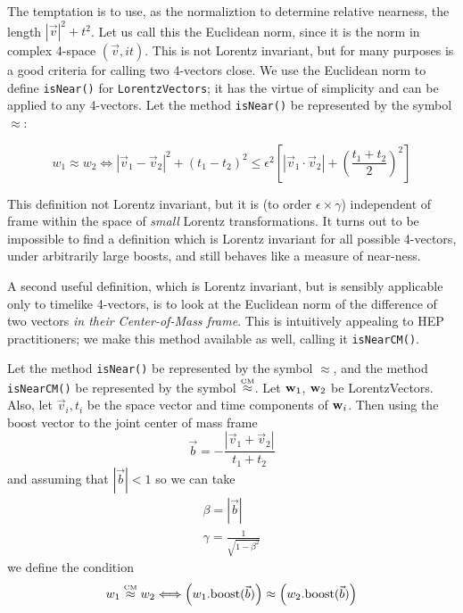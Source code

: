 The temptation is to use, as the normaliztion to determine relative nearness,
the length $|\vec{v}|^2 + t^2$.  Let us call this the Euclidean norm, since it
is the norm in complex 4-space $(\vec{v}, i t)$.
This is not Lorentz invariant, but for
many purposes is a good criteria for calling two 4-vectors close.
We use the Euclidean norm to define {\tt isNear()} for {\tt LorentzVectors};
it has the virtue of simplicity and can be applied to any 4-vectors.
Let the method {\tt isNear()} be represented by the symbol $\approx$:

\begin{equation}
\label{eq:wisNear}
  w_1 \approx w_2 \Longleftrightarrow
  \left|
    \vec{v}_1 - \vec{v}_2
  \right| ^2
  + (t_1 - t_2)^2 \leq
  \epsilon^2
  \left[
    \left|
      \vec{v}_1 \cdot \vec{v}_2
    \right|
    +
    \left(
      \frac{t_1 + t_2}{2}
    \right)^2
  \right]
\end{equation}

This definition not Lorentz invariant, but it
is (to order $\epsilon \times \gamma$) independent of frame
within the space of {\em small} Lorentz transformations.
It turns out to be impossible to find a definition which is
Lorentz invariant for all possible 4-vectors, under arbitrarily large
boosts, and still behaves like a measure of near-ness.

A second useful definition, which is Lorentz invariant, but is
sensibly applicable only to timelike 4-vectors,
is to look at the Euclidean norm of the difference of two vectors
{\em in their Center-of-Mass frame}.
This is intuitively appealing to HEP practitioners;
we make this method available as well, calling it {\tt isNearCM()}.

Let the method {\tt isNear()} be represented by the symbol $\approx$,
and the method {\tt isNearCM()} be represented by the symbol
$\stackrel{\mbox{\tiny CM}}{\approx}$.
Let ${\bf w}_{1}$, ${\bf w}_{2}$ be LorentzVectors.
Also, let
$\vec{v}_i, t_i$ be the space vector and time components of ${\bf w}_{i}$.
Then using the boost vector to the joint center of mass frame
\begin{equation}
  \vec{b} = - \frac { \left| \vec{v}_1 + \vec{v}_2 \right| } { t_1 + t_2 }
\end{equation}
\noindent
and assuming that $|\vec{b}| < 1$ so we can take
\begin{eqnarray}
  \beta = |\vec{b}| \\
  \gamma = \frac{1} {\sqrt {1-\beta^2 } }
\end{eqnarray}
\noindent
we define the condition
\begin{eqnarray}
\label{eq:wisNearCM}
  w_1 \stackrel{\mbox{\tiny CM}}{\approx} w_2 \Longleftrightarrow
    \left( w_1\mbox{.boost}(\vec{b}) \right) \approx
    \left( w_2\mbox{.boost}(\vec{b}) \right)
\end{eqnarray}

